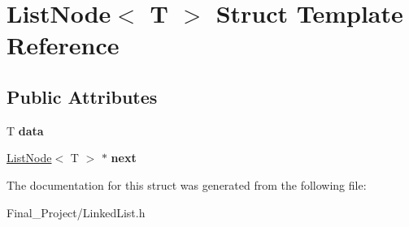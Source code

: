 \hypertarget{structListNode}{\section{List\-Node$<$ T $>$ Struct Template Reference}
\label{structListNode}
}
\subsection*{Public Attributes}
\begin{DoxyCompactItemize}
\item 
\hypertarget{structListNode_a935e06f21b246fb3a0987dd3f9d28528}{T {\bfseries data}}\label{structListNode_a935e06f21b246fb3a0987dd3f9d28528}

\item 
\hypertarget{structListNode_a97909c9598053ffd24b77ec715f745f1}{\hyperlink{structListNode}{List\-Node}$<$ T $>$ $\ast$ {\bfseries next}}\label{structListNode_a97909c9598053ffd24b77ec715f745f1}

\end{DoxyCompactItemize}


The documentation for this struct was generated from the following file\-:\begin{DoxyCompactItemize}
\item 
Final\-\_\-\-Project/Linked\-List.\-h\end{DoxyCompactItemize}
